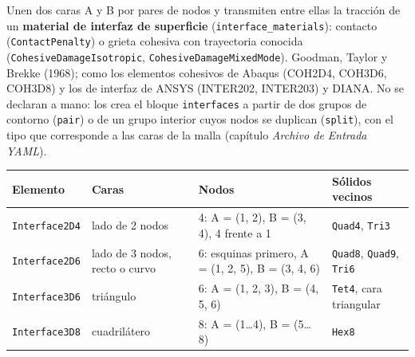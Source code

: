 \documentclass[11pt,oneside]{report}
\begin{document}
Unen dos caras A y B por pares de nodos y transmiten entre ellas la tracción de un \textbf{material de interfaz de superficie} (\texttt{interface\_\allowbreak{}materials}): contacto (\texttt{ContactPenalty}) o grieta cohesiva con trayectoria conocida (\texttt{CohesiveDamageIsotropic}, \texttt{CohesiveDamageMixedMode}). Goodman, Taylor y Brekke (1968); como los elementos cohesivos de Abaqus (COH2D4, COH3D6, COH3D8) y los de interfaz de ANSYS (INTER202, INTER203) y DIANA. No se declaran a mano: los crea el bloque \texttt{interfaces} a partir de dos grupos de contorno (\texttt{pair}) o de un grupo interior cuyos nodos se duplican (\texttt{split}), con el tipo que corresponde a las caras de la malla (capítulo \textit{Archivo de Entrada YAML}).

\begin{center}
\begin{tabularx}{\textwidth}{YYYY}
\hline
\textbf{Elemento} & \textbf{Caras} & \textbf{Nodos} & \textbf{Sólidos vecinos} \\
\hline
\texttt{Interface2D4} & lado de 2 nodos & 4: A = (1, 2), B = (3, 4), 4 frente a 1 & \texttt{Quad4}, \texttt{Tri3} \\
\texttt{Interface2D6} & lado de 3 nodos, recto o curvo & 6: esquinas primero, A = (1, 2, 5), B = (3, 4, 6) & \texttt{Quad8}, \texttt{Quad9}, \texttt{Tri6} \\
\texttt{Interface3D6} & triángulo & 6: A = (1, 2, 3), B = (4, 5, 6) & \texttt{Tet4}, cara triangular \\
\texttt{Interface3D8} & cuadrilátero & 8: A = (1\ldots{}4), B = (5\ldots{}8) & \texttt{Hex8} \\
\hline
\end{tabularx}
\end{center}
\end{document}
